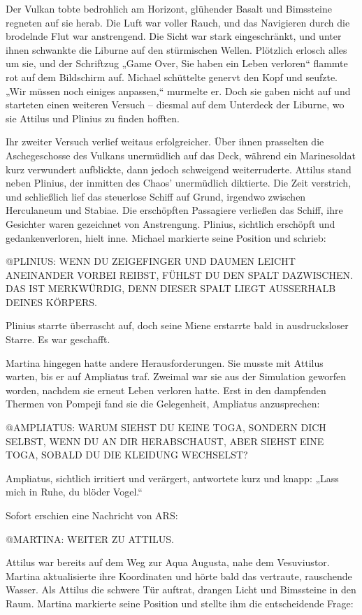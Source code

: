 \documentclass[
]{article}
\begin{document}
Der Vulkan tobte bedrohlich am Horizont, glühender Basalt und Bimssteine
regneten auf sie herab. Die Luft war voller Rauch, und das Navigieren
durch die brodelnde Flut war anstrengend. Die Sicht war stark
eingeschränkt, und unter ihnen schwankte die Liburne auf den stürmischen
Wellen. Plötzlich erlosch alles um sie, und der Schriftzug „Game Over,
Sie haben ein Leben verloren`` flammte rot auf dem Bildschirm auf.
Michael schüttelte genervt den Kopf und seufzte. „Wir müssen noch
einiges anpassen,`` murmelte er. Doch sie gaben nicht auf und starteten
einen weiteren Versuch -- diesmal auf dem Unterdeck der Liburne, wo sie
Attilus und Plinius zu finden hofften.

Ihr zweiter Versuch verlief weitaus erfolgreicher. Über ihnen prasselten
die Aschegeschosse des Vulkans unermüdlich auf das Deck, während ein
Marinesoldat kurz verwundert aufblickte, dann jedoch schweigend
weiterruderte. Attilus stand neben Plinius, der inmitten des Chaos'
unermüdlich diktierte. Die Zeit verstrich, und schließlich lief das
steuerlose Schiff auf Grund, irgendwo zwischen Herculaneum und Stabiae.
Die erschöpften Passagiere verließen das Schiff, ihre Gesichter waren
gezeichnet von Anstrengung. Plinius, sichtlich erschöpft und
gedankenverloren, hielt inne. Michael markierte seine Position und
schrieb:

@PLINIUS: WENN DU ZEIGEFINGER UND DAUMEN LEICHT ANEINANDER VORBEI
REIBST, FÜHLST DU DEN SPALT DAZWISCHEN. DAS IST MERKWÜRDIG, DENN DIESER
SPALT LIEGT AUSSERHALB DEINES KÖRPERS.

Plinius starrte überrascht auf, doch seine Miene erstarrte bald in
ausdrucksloser Starre. Es war geschafft.

Martina hingegen hatte andere Herausforderungen. Sie musste mit Attilus
warten, bis er auf Ampliatus traf. Zweimal war sie aus der Simulation
geworfen worden, nachdem sie erneut Leben verloren hatte. Erst in den
dampfenden Thermen von Pompeji fand sie die Gelegenheit, Ampliatus
anzusprechen:

@AMPLIATUS: WARUM SIEHST DU KEINE TOGA, SONDERN DICH SELBST, WENN DU AN
DIR HERABSCHAUST, ABER SIEHST EINE TOGA, SOBALD DU DIE KLEIDUNG
WECHSELST?

Ampliatus, sichtlich irritiert und verärgert, antwortete kurz und knapp:
„Lass mich in Ruhe, du blöder Vogel.``

Sofort erschien eine Nachricht von ARS:

@MARTINA: WEITER ZU ATTILUS.

Attilus war bereits auf dem Weg zur Aqua Augusta, nahe dem Vesuviustor.
Martina aktualisierte ihre Koordinaten und hörte bald das vertraute,
rauschende Wasser. Als Attilus die schwere Tür auftrat, drangen Licht
und Bimssteine in den Raum. Martina markierte seine Position und stellte
ihm die entscheidende Frage:
\end{document}
